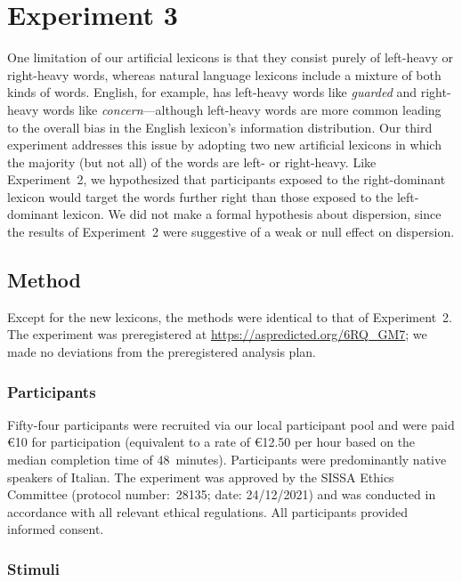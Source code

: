 \documentclass[doc,biblatex,floatsintext]{apa7}
\begin{document}
\section{Experiment 3}

One limitation of our artificial lexicons is that they consist purely of left-heavy or right-heavy words, whereas natural language lexicons include a mixture of both kinds of words. English, for example, has left-heavy words like \textit{guarded} and right-heavy words like \textit{concern}---although left-heavy words are more common leading to the overall bias in the English lexicon's information distribution. Our third experiment addresses this issue by adopting two new artificial lexicons in which the majority (but not all) of the words are left- or right-heavy. Like Experiment~2, we hypothesized that participants exposed to the right-dominant lexicon would target the words further right than those exposed to the left-dominant lexicon. We did not make a formal hypothesis about dispersion, since the results of Experiment~2 were suggestive of a weak or null effect on dispersion.

\subsection{Method}

Except for the new lexicons, the methods were identical to that of Experiment~2. The experiment was preregistered at \url{https://aspredicted.org/6RQ_GM7}; we made no deviations from the preregistered analysis plan.

\subsubsection{Participants}

Fifty-four participants were recruited via our local participant pool and were paid €10 for participation (equivalent to a rate of €12.50 per hour based on the median completion time of 48~minutes). Participants were predominantly native speakers of Italian. The experiment was approved by the SISSA Ethics Committee (protocol number:~28135; date: 24/12/2021) and was conducted in accordance with all relevant ethical regulations. All participants provided informed consent.

\subsubsection{Stimuli}
\end{document}
